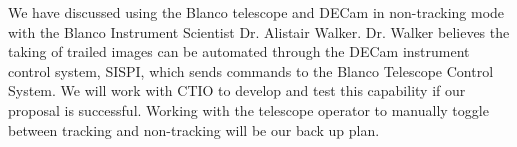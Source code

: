 \documentclass[11pt]{article}
\begin{document}



%
%




\specialrequest

We have discussed using the Blanco telescope and DECam in non-tracking mode with the Blanco Instrument Scientist Dr. Alistair Walker. Dr. Walker believes the taking of trailed images can be automated through the DECam instrument control system, SISPI, which sends commands to the Blanco Telescope Control System. We will work with CTIO to develop and test this capability if our proposal is successful. Working with the telescope operator to manually toggle between tracking and non-tracking will be our back up plan.

\end{document}
